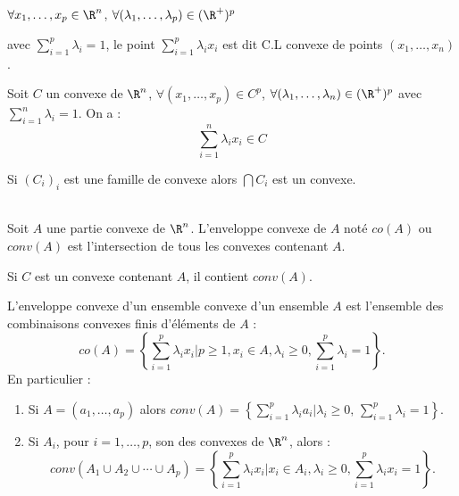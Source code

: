 \documentclass[12pt,a4paper]{article}
\begin{document}
	\begin{defi}
		$\forall x_1,\ldots,x_p \in \R^n$, $\forall (\lambda_1,\ldots,\lambda_p)\in(\R^+)^p$\\
		\begin{minipage}[t]{18cm}
			avec $\displaystyle\sum_{i=1}^p \lambda_i = 1$, le point $\displaystyle\sum_{i=1}^p \lambda_ix_i$ est dit C.L convexe de points $(x_1,\ldots,x_n)$.
		\end{minipage}
	\end{defi}
	
	\vspace{-.8cm}
	
	\begin{prop}
		Soit $C$ un convexe de $\R^n$, $\forall (x_1,\ldots,x_p) \in C^p$, $\forall (\lambda_1,\ldots,\lambda_n) \in (\R^+)^p$ avec  $\displaystyle\sum_{i=1}^n \lambda_i = 1$. On a :
		\[
			\sum_{i=1}^n \lambda_ix_i \in C
		\]
	\end{prop}
	
	\begin{prop}
		Si $(C_i)_i$ est une famille de convexe alors $\bigcap C_i$ est un convexe.
	\end{prop}
	
	\begin{prop}$ $\\
		Soit $A$ une  partie convexe de $\R^n$. L'enveloppe convexe de $A$ noté $co(A)$ ou $conv(A)$ est l'intersection de tous les convexes contenant $A$.
	\end{prop}	
	
	\begin{rmq}
		Si $C$ est un convexe contenant $A$, il contient $conv(A)$.
	\end{rmq}
	
	\begin{prop}
		L'enveloppe convexe d'un ensemble convexe d'un ensemble $A$ est l'ensemble des combinaisons convexes finis d'éléments de $A$ :
		\[
			co(A) = \left\{\sum_{i=1}^p \lambda_ix_i\Big|p\geq 1, x_i\in A, \lambda_i \geq 0, \sum_{i=1}^p \lambda_i = 1\right\}.
		\]
		En particulier :\\
		\begin{minipage}{18cm}
			\begin{enumerate}
			\item  Si $A = (a_1,\ldots,a_p)$ alors $conv(A) = \left\{\displaystyle\sum_{i=1}^p \lambda_i a_i\Big|\lambda_i \geq 0,\, \sum_{i=1}^p \lambda_i = 1\right\}$.
			
			\item  Si $A_i$, pour $i=1,\ldots,p$, son des convexes  de $\R^n$, alors :
			\[
				conv(A_1\cup A_2\cup\cdots\cup A_p) = \left\{\sum_{i=1}^p \lambda_i x_i\Big| x_i \in A_i, \lambda_i \geq 0, \sum_{i=1}^p \lambda_ix_i = 1\right\}.
			\]
		\end{enumerate}
		\end{minipage}
	\end{prop}
	
\end{document}
